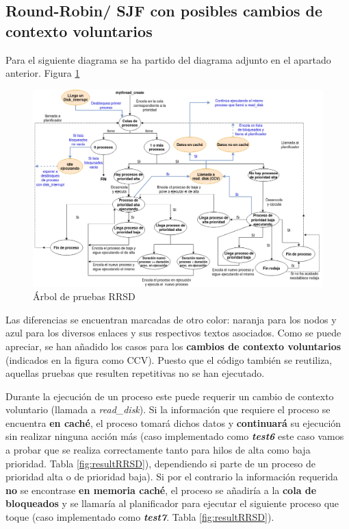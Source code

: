 \documentclass[10pt, spanish, pdftex]{template/UC3M_document}
\begin{document}
\subsection{Round-Robin/ SJF con posibles cambios de contexto voluntarios}
Para el siguiente diagrama se ha partido del diagrama adjunto en el apartado anterior. Figura \ref{fig:testRRSD}
\vspace{0.5cm}
\begin{figure}[h]
    \centering
    \includegraphics[width=15cm]{arboles/testRRSD.png}
    \caption{Árbol de pruebas RRSD}
    \label{fig:testRRSD}
\end{figure}

\newpage
Las diferencias se encuentran marcadas de otro color: naranja para los nodos y azul para los diversos enlaces y sus respectivos textos asociados. Como se puede apreciar, se han añadido los casos para los \textbf{cambios de contexto voluntarios} (indicados en la figura como CCV). Puesto que el código también se reutiliza, aquellas pruebas que resulten repetitivas no se han ejecutado.

Durante la ejecución de un proceso este puede requerir un cambio de contexto voluntario (llamada a \textit{read\_disk}). Si la información que requiere el proceso se encuentra \textbf{en caché}, el proceso tomará dichos datos y \textbf{continuará} su ejecución sin realizar ninguna acción más (caso implementado como \textbf{\textit{test6}} este caso vamos a probar que se realiza correctamente tanto para hilos de alta como baja prioridad. Tabla \ref{fig:resultRRSD}), dependiendo si parte de un proceso de prioridad alta o de prioridad baja). Si por el contrario la información requerida \textbf{no} se encontrase \textbf{en memoria caché}, el proceso se añadiría a la \textbf{cola de bloqueados} y se llamaría al planificador para ejecutar el siguiente proceso que toque (caso implementado como \textbf{\textit{test7}}. Tabla \ref{fig:resultRRSD}).
\end{document}
